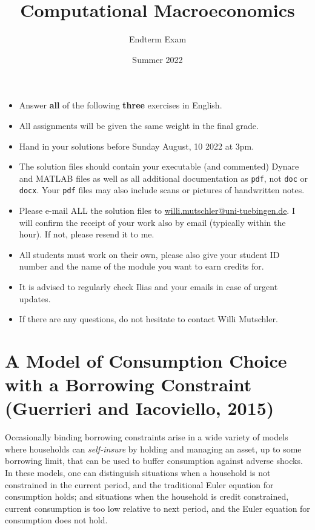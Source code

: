 \documentclass{article}
\begin{document}
	
\title{Computational Macroeconomics}
\author{Endterm Exam}
\date{Summer 2022}
\maketitle


\begin{itemize}
\item
Answer \textbf{all} of the following \textbf{three} exercises in English.
\item
All assignments will be given the same weight in the final grade.
\item
Hand in your solutions before Sunday August, 10 2022 at 3pm.
\item
The solution files should contain your executable (and commented) Dynare and MATLAB files
  as well as all additional documentation as \texttt{pdf}, not \texttt{doc} or \texttt{docx}.
Your \texttt{pdf} files may also include scans or pictures of handwritten notes.
\item
Please e-mail ALL the solution files to \url{willi.mutschler@uni-tuebingen.de}.
I will confirm the receipt of your work also by email (typically within the hour). If not, please resend it to me.
\item
All students must work on their own, please also give your student ID number and the name of the module you want to earn credits for.
\item
It is advised to regularly check Ilias and your emails in case of urgent updates.
\item
If there are any questions, do not hesitate to contact Willi Mutschler.
\end{itemize}

\newpage

\section[A Model of Consumption Choice with a Borrowing Constraint (Guerrieri and Iacoviello, 2015)]{A Model of Consumption Choice with a Borrowing Constraint (Guerrieri and Iacoviello, 2015)\label{ex:Guerrieri_Iacoviello_2015_borrcon}}
Occasionally binding borrowing constraints arise in a wide variety of models where households can \emph{self-insure} by holding and managing an asset,
  up to some borrowing limit, that can be used to buffer consumption against adverse shocks.
In these models, one can distinguish situations when a household is not constrained in the current period,
  and the traditional Euler equation for consumption holds;
  and situations when the household is credit constrained,
  current consumption is too low relative to next period,
  and the Euler equation for consumption does not hold.
\end{document}
